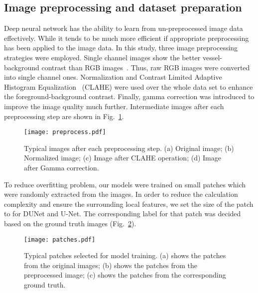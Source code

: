 \documentclass[journal]{IEEEtran}
\begin{document}
\subsection{Image preprocessing and dataset preparation}
Deep neural network has the ability to learn from un-preprocessed image data effectively. While it tends to be much more efficient if appropriate preprocessing has been applied to the image data. In this study, three image preprocessing strategies were employed. Single channel images show the better vessel-background contrast than RGB images~\cite{soares_retinal_2006}. Thus, raw RGB images were converted into single channel ones. Normalization and Contrast Limited Adaptive Histogram Equalization~\cite{pizer_adaptive_1987} (CLAHE) were used over the whole data set to enhance the foreground-background contrast. Finally, gamma correction was introduced to improve the image quality much further. Intermediate images after each preprocessing step are shown in Fig.~\ref{fig:preprocess}.
\begin{figure}
\centering
\texttt{[image: preprocess.pdf]}
\caption{Typical images after each preprocessing step. (a) Original image; (b) Normalized image; (c) Image after CLAHE operation; (d) Image after Gamma correction.}
\label{fig:preprocess}
\end{figure}


To reduce overﬁtting problem, our models were trained on small patches which were randomly extracted from the images. In order to reduce the calculation complexity and ensure the surrounding local features, we set the size of the patch to  for DUNet and U-Net. The corresponding label for that patch was decided based on the ground truth images (Fig.~\ref{fig:patches}).

\begin{figure}
\centering
\texttt{[image: patches.pdf]}
\caption{Typical  patches selected for model training. (a) shows the patches from the original images; (b) shows the patches from the preprocessed image; (c) shows the patches from the corresponding ground truth.}
\label{fig:patches}
\end{figure}
\end{document}
